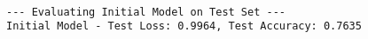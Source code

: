\documentclass[11pt]{article}
\begin{document}
    \begin{Verbatim}[commandchars=\\\{\}]

--- Evaluating Initial Model on Test Set ---
Initial Model - Test Loss: 0.9964, Test Accuracy: 0.7635
    \end{Verbatim}

    \begin{center}
    \end{center}
    { \hspace*{\fill} \\}
    
    \begin{Verbatim}[commandchars=\\\{\}]


\end{Verbatim}
\end{document}

